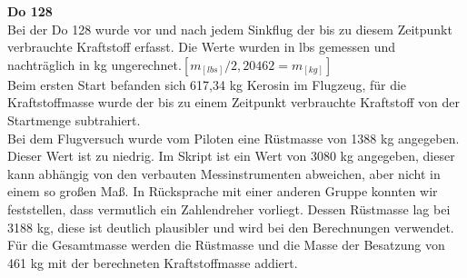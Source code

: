 \textbf{Do 128}\\
Bei der Do 128 wurde vor und nach jedem Sinkflug der bis zu diesem Zeitpunkt verbrauchte Kraftstoff erfasst. Die Werte wurden in lbs gemessen und nachträglich in kg ungerechnet.$ [m_{[lbs]}/2,20462 = m_{[kg]}]$\\
Beim ersten Start befanden sich 617,34 kg Kerosin im Flugzeug, für die Kraftstoffmasse wurde der bis zu einem Zeitpunkt verbrauchte Kraftstoff von der Startmenge subtrahiert. \\
Bei dem Flugversuch wurde vom Piloten eine Rüstmasse von 1388 kg angegeben. Dieser Wert ist zu niedrig. Im Skript ist ein Wert von 3080 kg angegeben, dieser kann abhängig von den verbauten Messinstrumenten abweichen, aber nicht in einem so großen Maß. In Rücksprache mit einer anderen Gruppe konnten wir feststellen, dass vermutlich ein Zahlendreher vorliegt. Dessen Rüstmasse lag bei 3188 kg, diese ist deutlich plausibler und wird bei den Berechnungen verwendet.
Für die Gesamtmasse werden die Rüstmasse und die Masse der Besatzung von 461 kg mit der berechneten Kraftstoffmasse addiert. 
 \\


